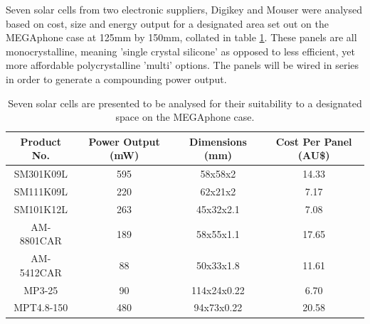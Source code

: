 Seven solar cells from two electronic suppliers, Digikey and Mouser were analysed based on cost, size and energy output for a designated area set out on the MEGAphone case at 125mm by 150mm, collated in table \ref{tab:Solar}.
These panels are all monocrystalline, meaning 'single crystal silicone' as opposed to less efficient, yet more affordable polycrystalline 'multi' options.
The panels will be wired in series in order to generate a compounding power output.

\begin{table} [h]
    \begin{center}
        \vspace{5mm}
        \caption{Seven solar cells are presented to be analysed for their suitability to a designated space on the MEGAphone case.}
        \label{tab:Solar}
        \begin{tabular}{ |c|c|c|c| }
        \hline
        Product No. & Power Output (mW) & Dimensions (mm) & Cost Per Panel (AU\$) \\
        \hline
        SM301K09L \cite{SM301K09L} & 595 & 58x58x2 & 14.33 \\
        \hline
        SM111K09L \cite{SM111K09L} & 220 & 62x21x2 & 7.17 \\ 
        \hline
        SM101K12L \cite{SM101K12L} & 263 & 45x32x2.1 & 7.08 \\
        \hline
        AM-8801CAR \cite{am8801} & 189 & 58x55x1.1 & 17.65 \\
        \hline
        AM-5412CAR \cite{am5412} & 88 & 50x33x1.8 & 11.61 \\
        \hline
        MP3-25 \cite{mp3} & 90 & 114x24x0.22 & 6.70 \\
        \hline
        MPT4.8-150 \cite{mpt} & 480 & 94x73x0.22 & 20.58 \\
        \hline
        \end{tabular}
    \end{center}
\end{table}

